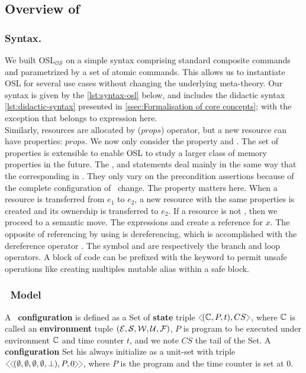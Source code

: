 \subsection{Overview of \oslos }

\subsubsection{Syntax.}

We built OSL$_{\mathcal{OS}}$ on a simple syntax comprising standard composite commands and parametrized by a set of atomic commands. This allows us to instantiate OSL for several use cases without changing the underlying meta-theory. Our syntax  is given by the \autoref{lst:syntax-osl} below, and includes the didactic syntax \autoref{lst:didactic-syntax} presented in \autoref{ssec:Formalisation of core concepts}; with the exception that  belongs to expression here. \\ 



Similarly, resources are allocated by ($props$) operator, but a new resource can have properties: $props$. We now only consider the property  and .
The set of properties is extensible to enable OSL to study a larger class of memory properties in the future.
The ,  and  statements deal mainly in the same way that the corresponding in \osld.
They only vary on the precondition assertions because of the complete configuration of \oslos~change.  
The property  matters here. When a  resource  is transferred  from $e_1$ to $e_2$, a new resource with the same properties is created and its ownership is transferred to $e_2$.
If a resource is not , then we proceed to a semantic move.
The expressions  and  create a reference for $x$.
The opposite of referencing by using \term{\&}  is dereferencing, which is accomplished with the dereference operator \term{$\star$}.
The symbol  and \term{!} are respectively the branch and loop operators.
A block of code can be prefixed with the  keyword to permit unsafe operations like creating multiples mutable alias within a safe block.
\subsubsection{\oslos~Model}

\begin{definition}
    A \oslos~\textbf{configuration} is defined as a Set of \textbf{state} triple $\cfg{ (\confosl, P, t), CS }$, where $\mathbb{C}$ is called an \textbf{environment} tuple $(\mathcal{E},\mathcal{S},\mathcal{W}, \mathcal{U}, \mathcal{F})$, $P$ is program to be executed under environment $\mathbb{C}$ and time counter $t$, and we note $CS$ the tail of the Set. A \textbf{configuration} Set his always initialize as a unit-set with triple $\cfg{ \cfg{(\emptyset,\emptyset,\emptyset, \emptyset, \bot), P, 0}}$, where $P$ is the program and the time counter is set at 0.
\end{definition}


